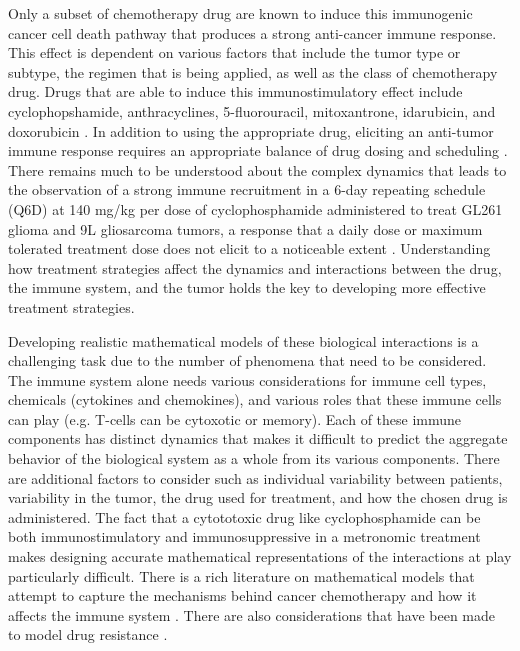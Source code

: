 Only a subset of chemotherapy drug are known to induce this immunogenic cancer cell death pathway that produces a strong anti-cancer immune response. This effect is dependent on various factors that include the tumor type or subtype, the regimen that is being applied, as well as the class of chemotherapy drug. Drugs that are able to induce this immunostimulatory effect include cyclophopshamide, anthracyclines, 5-fluorouracil, mitoxantrone, idarubicin, and doxorubicin \cite{zitvogul2008,chen2013chemoimmunotherapy,bracci2014immune,vacchelli2014trial,pol2015trial}. In addition to using the appropriate drug, eliciting an anti-tumor immune response requires an appropriate balance of drug dosing and scheduling \cite{wu2018immunogenic,park2019goldilocks,tran2020delicate}. There remains much to be understood about the complex dynamics that leads to the observation of a strong immune recruitment in a 6-day repeating schedule (Q6D) at 140 mg/kg per dose of cyclophosphamide administered to treat GL261 glioma and 9L gliosarcoma tumors, a response that a daily dose or maximum tolerated treatment dose does not elicit to a noticeable extent \cite{wu2014metronomic,chen2014intermittent,doloff2012vegf}. Understanding how treatment strategies affect the dynamics and interactions between the drug, the immune system, and the tumor holds the key to developing more effective treatment strategies.

Developing realistic mathematical models of these biological interactions is a challenging task due to the number of phenomena that need to be considered. The immune system alone needs various considerations for immune cell types, chemicals (cytokines and chemokines), and various roles that these immune cells can play (e.g. T-cells can be cytoxotic or memory). Each of these immune components has distinct dynamics that makes it difficult to predict the aggregate behavior of the biological system as a whole from its various components. There are additional factors to consider such as individual variability between patients, variability in the tumor, the drug used for treatment, and how the chosen drug is administered. The fact that a cytototoxic drug like cyclophosphamide can be both immunostimulatory and immunosuppressive in a metronomic treatment makes designing accurate mathematical representations of the interactions at play particularly difficult. There is a rich literature on mathematical models that attempt to capture the mechanisms behind cancer chemotherapy and how it affects the immune system \cite{de2005clinical,de2006mixed,ciccolini2017pharmacokinetics,park2019goldilocks}. There are also considerations that have been made to model drug resistance \cite{greene2019mathematical}.

